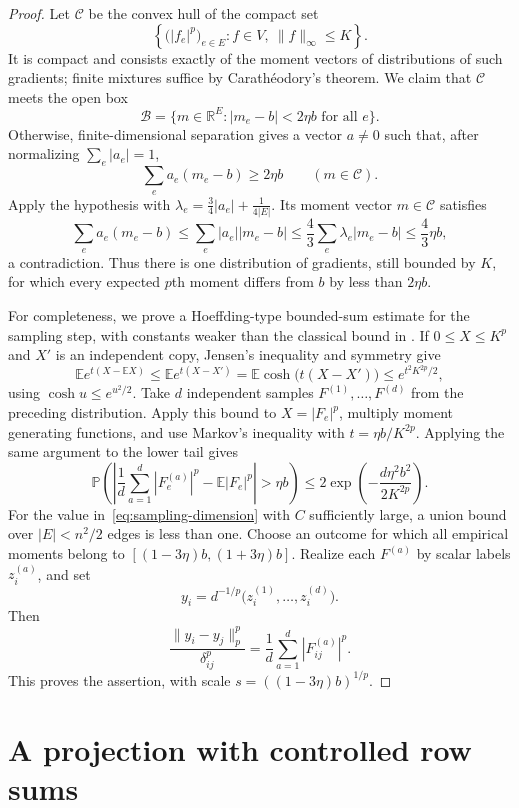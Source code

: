 \documentclass[11pt]{article}
\newcommand{\R}{\mathbb R}
\newcommand{\E}{\mathbb E}
\newcommand{\Prob}{\mathbb P}
\theoremstyle{remark}
\numberwithin{equation}{section}
\begin{document}
\begin{proof}
Let $\mathcal C$ be the convex hull of the compact set
\[
 \left\{\bigl(|f_e|^p\bigr)_{e\in E}: f\in V,\ \|f\|_\infty\le K\right\}.
\]
It is compact and consists exactly of the moment vectors of
distributions of such gradients; finite mixtures suffice by
Carath\'eodory's theorem. We claim that $\mathcal C$ meets the open box
\[
 \mathcal B=\{m\in\R^E: |m_e-b|<2\eta b\text{ for all }e\}.
\]
Otherwise, finite-dimensional separation
\cite[Theorem~11.3]{Rockafellar1970} gives a vector $a\ne0$ such that, after
normalizing $\sum_e|a_e|=1$,
\[
 \sum_e a_e(m_e-b)\ge2\eta b\qquad(m\in\mathcal C).
\]
Apply the hypothesis with
$\lambda_e=\frac34|a_e|+\frac1{4|E|}$. Its moment vector $m\in\mathcal C$
satisfies
\[
 \sum_e a_e(m_e-b)
 \le\sum_e|a_e||m_e-b|
 \le\frac43\sum_e\lambda_e|m_e-b|
 \le\frac43\eta b,
\]
a contradiction. Thus there is one distribution of gradients,
still bounded by $K$, for which every expected $p$th moment differs
from $b$ by less than $2\eta b$.

For completeness, we prove a Hoeffding-type bounded-sum estimate for the
sampling step, with constants weaker than the classical bound in
\cite[Theorem~2, p.~16, equation~(2.6)]{Hoeffding1963}.
If $0\le X\le K^p$ and $X'$ is an independent copy, Jensen's
inequality and symmetry give
\[
 \E e^{t(X-\E X)}
 \le\E e^{t(X-X')}
 =\E\cosh\bigl(t(X-X')\bigr)
 \le e^{t^2K^{2p}/2},
\]
using $\cosh u\le e^{u^2/2}$. Take $d$ independent samples
$F^{(1)},\ldots,F^{(d)}$ from the preceding distribution. Apply this
bound to $X=|F_e|^p$, multiply moment generating functions, and use
Markov's inequality with $t=\eta b/K^{2p}$. Applying the same argument
to the lower tail gives
\[
 \Prob\left(
 \left|\frac1d\sum_{a=1}^d|F_e^{(a)}|^p-\E|F_e|^p\right|>\eta b
 \right)
 \le2\exp\left(-\frac{d\eta^2b^2}{2K^{2p}}\right).
\]
For the value in~\eqref{eq:sampling-dimension} with $C$ sufficiently
large, a union bound over $|E|<n^2/2$ edges is less than one. Choose
an outcome for which all empirical moments belong to
$[(1-3\eta)b,(1+3\eta)b]$. Realize each $F^{(a)}$ by scalar labels
$z_i^{(a)}$, and set
\[
 y_i=d^{-1/p}\bigl(z_i^{(1)},\ldots,z_i^{(d)}\bigr).
\]
Then
\[
 \frac{\|y_i-y_j\|_p^p}{\delta_{ij}^p}
 =\frac1d\sum_{a=1}^d|F_{ij}^{(a)}|^p.
\]
This proves the assertion, with scale $s=((1-3\eta)b)^{1/p}$.
\end{proof}

\section{A projection with controlled row sums}
\label{sec:projection}
\end{document}
